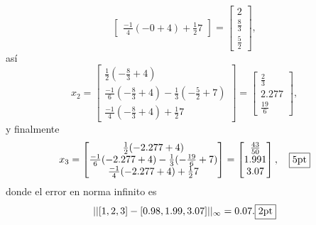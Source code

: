 \documentclass[11pt]{article}
\begin{document}
\begin{enumerate}
$$\begin{bmatrix}
\frac{-1}{4}(-0+4)+\frac{1}{2}7
\end{bmatrix}
=
\begin{bmatrix}
2 \\\frac{8}{3}\\\frac{5}{2}
\end{bmatrix},
$$
as\'i
$$
x_2=\begin{bmatrix}
\frac{1}{2}(-\frac{8}{3}+4) \\
\frac{-1}{6}(-\frac{8}{3}+4)-\frac{1}{3}(-\frac{5}{2}+7) \\
\frac{-1}{4}(-\frac{8}{3}+4)+\frac{1}{2}7
\end{bmatrix}
=
\begin{bmatrix}
\frac{2}{3} \\2.277 \\\frac{19}{6}
\end{bmatrix},
$$
y finalmente
$$
x_3=\begin{bmatrix}
\frac{1}{2}(-2.277+4) \\
\frac{-1}{6}(-2.277+4)-\frac{1}{3}(-\frac{19}{6}+7) \\
\frac{-1}{4}(-2.277+4)+\frac{1}{2}7
\end{bmatrix}
=
\begin{bmatrix}
\frac{43}{50} \\1.991 \\ 3.07
\end{bmatrix}, \quad  \fbox{5pt}
$$
donde el error en norma infinito es
$$
||[1,2,3]-[0.98,1.99,3.07]||_{\infty}=0.07. \fbox{2pt}
$$


\end{enumerate}
\end{document}

